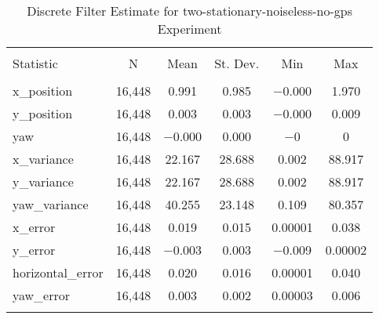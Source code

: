 
\begin{table}[h] \centering 
  \caption{Discrete Filter Estimate for two-stationary-noiseless-no-gps Experiment} 
  \label{tab:two_stationary_noiseless_no_gps_discrete_summary} 
\begin{tabular}{@{\extracolsep{5pt}}lccccc} 
\\[-1.8ex]\hline 
\hline \\[-1.8ex] 
Statistic & \multicolumn{1}{c}{N} & \multicolumn{1}{c}{Mean} & \multicolumn{1}{c}{St. Dev.} & \multicolumn{1}{c}{Min} & \multicolumn{1}{c}{Max} \\ 
\hline \\[-1.8ex] 
x\_position & 16,448 & 0.991 & 0.985 & $-$0.000 & 1.970 \\ 
y\_position & 16,448 & 0.003 & 0.003 & $-$0.000 & 0.009 \\ 
yaw & 16,448 & $-$0.000 & 0.000 & $-$0 & 0 \\ 
x\_variance & 16,448 & 22.167 & 28.688 & 0.002 & 88.917 \\ 
y\_variance & 16,448 & 22.167 & 28.688 & 0.002 & 88.917 \\ 
yaw\_variance & 16,448 & 40.255 & 23.148 & 0.109 & 80.357 \\ 
x\_error & 16,448 & 0.019 & 0.015 & 0.00001 & 0.038 \\ 
y\_error & 16,448 & $-$0.003 & 0.003 & $-$0.009 & 0.00002 \\ 
horizontal\_error & 16,448 & 0.020 & 0.016 & 0.00001 & 0.040 \\ 
yaw\_error & 16,448 & 0.003 & 0.002 & 0.00003 & 0.006 \\ 
\hline \\[-1.8ex] 
\end{tabular} 
\end{table} 
